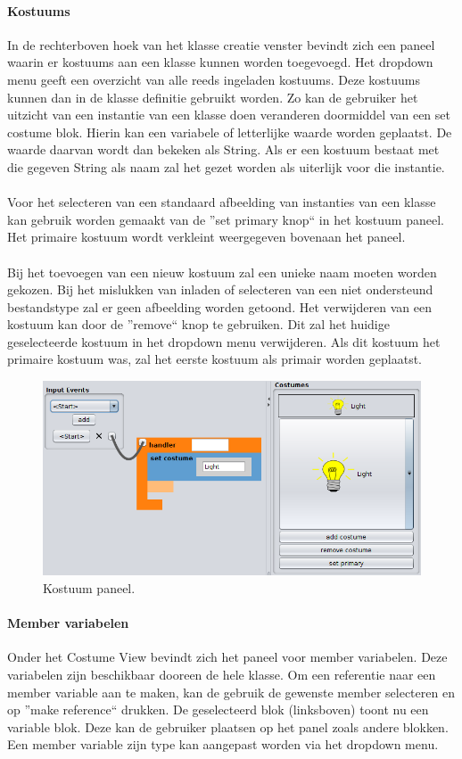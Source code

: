 \documentclass[]{article}
\begin{document}
\paragraph{Kostuums}
In de rechterboven hoek van het klasse creatie venster bevindt zich een paneel waarin er kostuums aan een klasse kunnen worden toegevoegd. Het dropdown menu geeft een overzicht van alle reeds ingeladen kostuums. Deze kostuums kunnen dan in de klasse definitie gebruikt worden. Zo kan de gebruiker het uitzicht van een instantie van een klasse doen veranderen doormiddel van een set costume blok. Hierin kan een variabele of letterlijke waarde worden geplaatst. De waarde daarvan wordt dan bekeken als String. Als er een kostuum bestaat met die gegeven String als naam zal het gezet worden als uiterlijk voor die instantie.\\\\
Voor het selecteren van een standaard afbeelding van instanties van een klasse kan gebruik worden gemaakt van de ''set primary knop`` in het kostuum paneel. Het primaire kostuum wordt verkleint weergegeven bovenaan het paneel.\\\\
Bij het toevoegen van een nieuw kostuum zal een unieke naam moeten worden gekozen. Bij het mislukken van inladen of selecteren van een niet ondersteund bestandstype zal er geen afbeelding worden getoond. Het verwijderen van een kostuum kan door de ''remove`` knop te gebruiken. Dit zal het huidige geselecteerde kostuum in het dropdown menu verwijderen. Als dit kostuum het primaire kostuum was, zal het eerste kostuum als primair worden geplaatst.
\begin{figure}[H]
  \centering
\includegraphics[scale=0.4]{Documentatie/images/costume}
  \caption{Kostuum paneel.} 
\end{figure}
\paragraph{Member variabelen}
Onder het Costume View bevindt zich het paneel voor member variabelen. Deze variabelen zijn beschikbaar dooreen de hele klasse. Om een referentie naar een member variable aan te maken, kan de gebruik de gewenste member selecteren en op ''make reference`` drukken. De geselecteerd blok (linksboven) toont nu een variable blok. Deze kan de gebruiker plaatsen op het panel zoals andere blokken. Een member variable zijn type kan aangepast worden via het dropdown menu.
\end{document}
